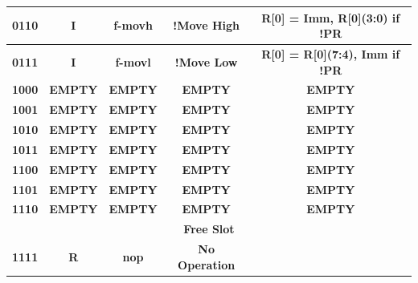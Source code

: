 \documentclass{article}
\begin{document}
\begin{table}[H]
\begin{tabular}{|c|*{4}{c|}}
        \multicolumn{1}{|c|}{\textbf{0110}}   & \multicolumn{1}{c|}{\textbf{I}}     & \multicolumn{1}{c|}{\textbf{f-movh}}    & \multicolumn{1}{c|}{\textbf{!Move High}}   & \multicolumn{1}{c|}{\textbf{R[0] = {Imm, R[0](3:0)} if !PR}} \\ \hline
        \multicolumn{1}{|c|}{\textbf{0111}}   & \multicolumn{1}{c|}{\textbf{I}}     & \multicolumn{1}{c|}{\textbf{f-movl}}    & \multicolumn{1}{c|}{\textbf{!Move Low}}    & \multicolumn{1}{c|}{\textbf{R[0] = {R[0](7:4), Imm} if !PR}} \\ \hline
        \multicolumn{1}{|c|}{\textbf{1000}}   & \multicolumn{1}{c|}{\textbf{EMPTY}} & \multicolumn{1}{c|}{\textbf{EMPTY}}     & \multicolumn{1}{c|}{\textbf{EMPTY}}        & \multicolumn{1}{c|}{\textbf{EMPTY}}                          \\ \hline
        \multicolumn{1}{|c|}{\textbf{1001}}   & \multicolumn{1}{c|}{\textbf{EMPTY}} & \multicolumn{1}{c|}{\textbf{EMPTY}}     & \multicolumn{1}{c|}{\textbf{EMPTY}}        & \multicolumn{1}{c|}{\textbf{EMPTY}}                          \\ \hline
        \multicolumn{1}{|c|}{\textbf{1010}}   & \multicolumn{1}{c|}{\textbf{EMPTY}} & \multicolumn{1}{c|}{\textbf{EMPTY}}     & \multicolumn{1}{c|}{\textbf{EMPTY}}        & \multicolumn{1}{c|}{\textbf{EMPTY}}                          \\ \hline
        \multicolumn{1}{|c|}{\textbf{1011}}   & \multicolumn{1}{c|}{\textbf{EMPTY}} & \multicolumn{1}{c|}{\textbf{EMPTY}}     & \multicolumn{1}{c|}{\textbf{EMPTY}}        & \multicolumn{1}{c|}{\textbf{EMPTY}}                          \\ \hline
        \multicolumn{1}{|c|}{\textbf{1100}}   & \multicolumn{1}{c|}{\textbf{EMPTY}} & \multicolumn{1}{c|}{\textbf{EMPTY}}     & \multicolumn{1}{c|}{\textbf{EMPTY}}        & \multicolumn{1}{c|}{\textbf{EMPTY}}                          \\ \hline
        \multicolumn{1}{|c|}{\textbf{1101}}   & \multicolumn{1}{c|}{\textbf{EMPTY}} & \multicolumn{1}{c|}{\textbf{EMPTY}}     & \multicolumn{1}{c|}{\textbf{EMPTY}}        & \multicolumn{1}{c|}{\textbf{EMPTY}}                          \\ \hline
        \multicolumn{1}{|c|}{\textbf{1110}}   & \multicolumn{1}{c|}{\textbf{EMPTY}} & \multicolumn{1}{c|}{\textbf{EMPTY}}     & \multicolumn{1}{c|}{\textbf{EMPTY}}        & \multicolumn{1}{c|}{\textbf{EMPTY}}                          \\ \hline
        \multicolumn{5}{|c|}{\textbf{Free Slot}}                                                                                                                                                                                          \\ \hline 
        \multicolumn{1}{|c|}{\textbf{1111}}   & \multicolumn{1}{c|}{\textbf{R}}     & \multicolumn{1}{c|}{\textbf{nop}}       & \multicolumn{1}{c|}{\textbf{No Operation}} & \multicolumn{1}{c|}{\textbf{}}                               \\ \hline
      \end{tabular}
    \end{table}
\end{document}
